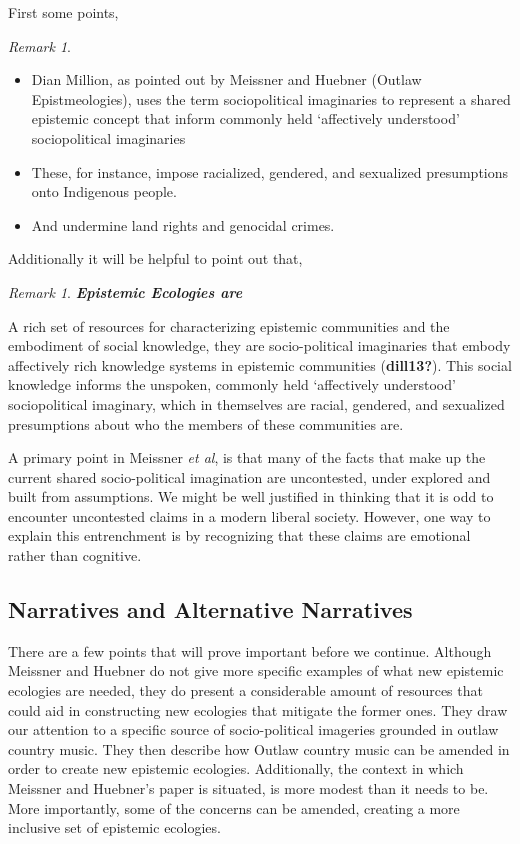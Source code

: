 \documentclass[12pt]{book}
\theoremstyle{definition}
\theoremstyle{remark}
\newtheorem{remark}[theorem]{Remark}
\providecommand{\tightlist}{%
  \setlength{\itemsep}{0pt}\setlength{\parskip}{0pt}}
\begin{document}
First some points,

\begin{remark}
\leavevmode

\begin{itemize}
\tightlist
\item
  Dian Million, as pointed out by Meissner and Huebner (Outlaw Epistmeologies), uses the term sociopolitical imaginaries to represent a shared epistemic concept that inform commonly held `affectively understood' sociopolitical imaginaries
\item
  These, for instance, impose racialized, gendered, and sexualized presumptions onto Indigenous people.
\item
  And undermine land rights and genocidal crimes.
\end{itemize}

\end{remark}

Additionally it will be helpful to point out that,

\begin{remark}
\textbf{\emph{Epistemic Ecologies are}}

A rich set of resources for characterizing epistemic communities and the embodiment of social knowledge, they are socio-political imaginaries that embody affectively rich knowledge systems in epistemic communities (\textbf{dill13?}). This social knowledge informs the unspoken, commonly held `affectively understood' sociopolitical imaginary, which in themselves are racial, gendered, and sexualized presumptions about who the members of these communities are.
\end{remark}

A primary point in Meissner \emph{et al}, is that many of the facts that make up the current shared socio-political imagination are uncontested, under explored and built from assumptions. We might be well justified in thinking that it is odd to encounter uncontested claims in a modern liberal society. However, one way to explain this entrenchment is by recognizing that these claims are emotional rather than cognitive.

\subsection{Narratives and Alternative Narratives}\label{narratives-and-alternative-narratives}

There are a few points that will prove important before we continue. Although Meissner and Huebner do not give more specific examples of what new epistemic ecologies are needed, they do present a considerable amount of resources that could aid in constructing new ecologies that mitigate the former ones. They draw our attention to a specific source of socio-political imageries grounded in outlaw country music. They then describe how Outlaw country music can be amended in order to create new epistemic ecologies. Additionally, the context in which Meissner and Huebner's paper is situated, is more modest than it needs to be. More importantly, some of the concerns can be amended, creating a more inclusive set of epistemic ecologies.
\end{document}
